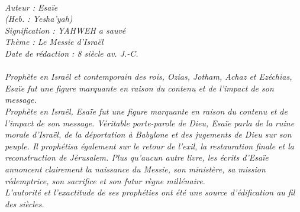 \BFont
\noindent\hrulefill
{\footnotesize
\textit{
\bigskip
{\centering{}
\\Auteur : Esaïe
\\(Heb. : Yesha'yah)
\\Signification : YAHWEH a sauvé
\\Thème : Le Messie d'Israël
\\Date de rédaction : 8 siècle av. J.-C.\\}
}
\textit{
\\Prophète en Israël et contemporain des rois, Ozias, Jotham, Achaz et Ezéchias, Esaïe fut une figure marquante en raison du contenu et de l'impact de son message.
\\Prophète en Israël, Esaïe fut une figure marquante en raison du contenu et de l'impact de son message. Véritable porte-parole de Dieu, Esaïe parla de la ruine morale d'Israël, de la déportation à Babylone et des jugements de Dieu sur son peuple. Il prophétisa également sur le retour de l'exil, la restauration finale et la reconstruction de Jérusalem. Plus qu'aucun autre livre, les écrits d'Esaïe annoncent clairement la naissance du Messie, son ministère, sa mission rédemptrice, son sacrifice et son futur règne millénaire. 
\\L'autorité et l'exactitude de ses prophéties ont été une source d'édification au fil des siècles.\bigskip
}
}
\par\nobreak\noindent\hrulefill
